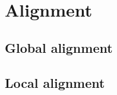 \documentclass[12pt, letterpaper]{article}
\begin{document}
\section{Alignment}

\subsection{Global alignment}

\subsection{Local alignment}
\end{document}
